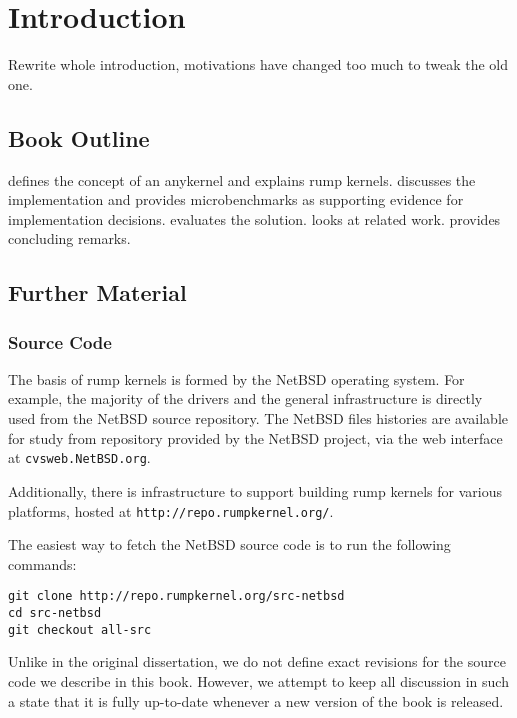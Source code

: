 
\section{Introduction}
\label{chap:introduction}

Rewrite whole introduction, motivations have changed too much to tweak
the old one.

\subsection{Book Outline}

 defines the concept of an anykernel and explains
rump kernels.
 discusses the implementation and provides
microbenchmarks as supporting evidence for implementation decisions.
 evaluates the solution.
 looks at related work.
 provides concluding remarks.


\subsection{Further Material}

\subsubsection{Source Code}
\label{sect:src}

The basis of rump kernels is formed by the NetBSD operating system.
For example, the majority of the drivers and the general infrastructure
is directly used from the NetBSD source repository.
The NetBSD files histories are available for study from repository
provided by the NetBSD project, \eg via the web interface at
\texttt{cvsweb.NetBSD.org}.

Additionally, there is infrastructure to support building rump kernels
for various platforms, hosted at \texttt{http://repo.rumpkernel.org/}.

The easiest way to fetch the NetBSD source code is to run the following
commands:

\begin{verbatim}
git clone http://repo.rumpkernel.org/src-netbsd
cd src-netbsd
git checkout all-src
\end{verbatim}

Unlike in the original dissertation, we do not define exact revisions
for the source code we describe in this book.  However, we attempt to
keep all discussion in such a state that it is fully up-to-date whenever
a new version of the book is released.

